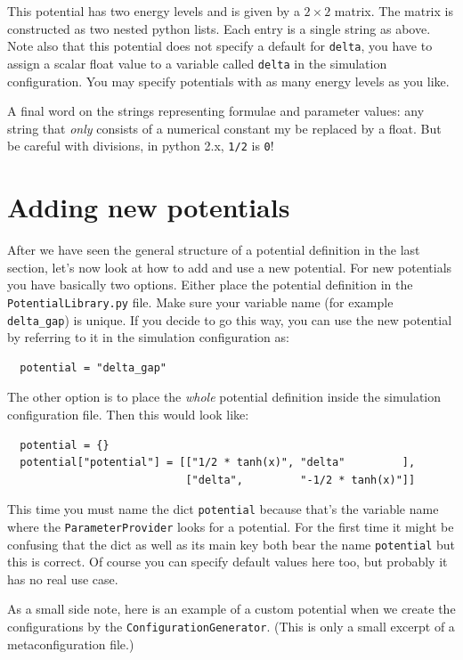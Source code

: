 \documentclass[a4paper,10pt]{report}
\begin{document}
This potential has two energy levels and is given by a $2 \times 2$ matrix.
The matrix is constructed as two nested python lists. Each entry is a single
string as above. Note also that this potential does not specify a default
for \texttt{delta}, you have to assign a scalar float value to a variable
called \texttt{delta} in the simulation configuration. You may specify potentials
with as many energy levels as you like.

A final word on the strings representing formulae and parameter values: any string
that \emph{only} consists of a numerical constant my be replaced by a float. But
be careful with divisions, in python 2.x, \texttt{1/2} is \texttt{0}!

\section{Adding new potentials}

After we have seen the general structure of a potential definition in the last
section, let's now look at how to add and use a new potential. For new potentials
you have basically two options. Either place the potential definition in the
\texttt{PotentialLibrary.py} file. Make sure your variable name (for example
\texttt{delta\_gap}) is unique. If you decide to go this way, you can use
the new potential by referring to it in the simulation configuration as:

\begin{verbatim}
  potential = "delta_gap"
\end{verbatim}

The other option is to place the \emph{whole} potential definition inside the
simulation configuration file. Then this would look like:

\begin{verbatim}
  potential = {}
  potential["potential"] = [["1/2 * tanh(x)", "delta"         ],
                            ["delta",         "-1/2 * tanh(x)"]]
\end{verbatim}

This time you must name the dict \texttt{potential} because that's the
variable name where the \texttt{ParameterProvider} looks for a potential.
For the first time it might be confusing that the dict as well as its main
key both bear the name \texttt{potential} but this is correct. Of course you
can specify default values here too, but probably it has no real use case.

As a small side note, here is an example of a custom potential when we create
the configurations by the \texttt{ConfigurationGenerator}. (This is only a small
excerpt of a metaconfiguration file.)
\end{document}
